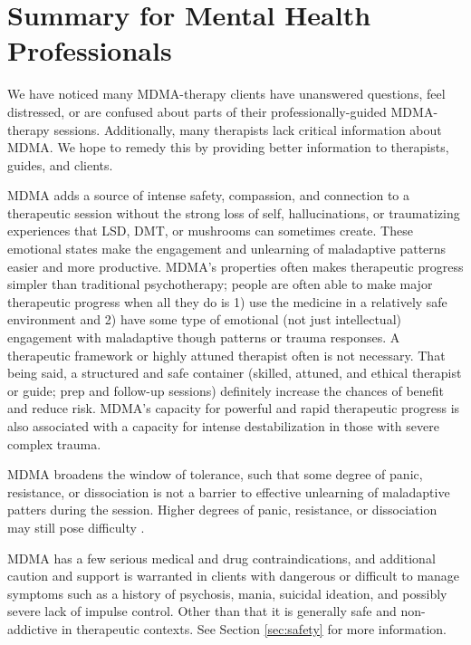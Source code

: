 \documentclass[12pt,letterpaper]{book}
\begin{document}
\section{Summary for Mental Health Professionals}
We have noticed many MDMA-therapy clients have unanswered questions, feel distressed, or are confused about parts of their professionally-guided MDMA-therapy sessions. Additionally, many therapists lack critical information about MDMA. We hope to remedy this by providing better information to therapists, guides, and clients.

MDMA adds a source of intense safety, compassion, and connection to a therapeutic session without the strong loss of self, hallucinations, or traumatizing experiences that LSD, DMT, or mushrooms can sometimes create. These emotional states make the engagement and unlearning of maladaptive patterns easier and more productive. MDMA's properties often makes therapeutic progress simpler than traditional psychotherapy; people are often able to make major therapeutic progress when all they do is 1) use the medicine in a relatively safe environment and 2) have some type of emotional (not just intellectual) engagement with maladaptive though patterns or trauma responses. A therapeutic framework or highly attuned therapist often is not necessary. That being said, a structured and safe container (skilled, attuned, and ethical therapist or guide; prep and follow-up sessions) definitely increase the chances of benefit and reduce risk. MDMA's capacity for powerful and rapid therapeutic progress is also associated with a capacity for intense destabilization in those with severe complex trauma.

MDMA broadens the window of tolerance, such that some degree of panic, resistance, or dissociation is not a barrier to effective unlearning of maladaptive patters during the session. Higher degrees of panic, resistance, or dissociation may still pose difficulty \cite{razviPresentation}.

MDMA has a few serious medical and drug contraindications, and additional caution and support is warranted in clients with dangerous or difficult to manage symptoms such as a history of psychosis, mania, suicidal ideation, and possibly severe lack of impulse control. Other than that it is generally safe and non-addictive in therapeutic contexts. See Section \ref{sec:safety} for more information.
\end{document}
